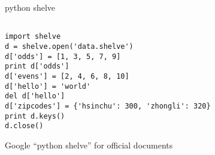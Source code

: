 \documentclass[12pt,c]{beamer}
\begin{document}
\begin{frame}[containsverbatim]{python shelve}
\begin{verbatim}

import shelve
d = shelve.open('data.shelve')
d['odds'] = [1, 3, 5, 7, 9]
print d['odds']
d['evens'] = [2, 4, 6, 8, 10]
d['hello'] = 'world'
del d['hello']
d['zipcodes'] = {'hsinchu': 300, 'zhongli': 320}
print d.keys()
d.close()

\end{verbatim}
Google ``python shelve'' for official documents
\end{frame}  
\end{document}
